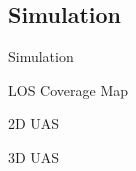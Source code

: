 \subsection{Simulation}

\begin{frame}{Simulation}{}

  \begin{block}{LOS Coverage Map}

  \end{block}
  
  \begin{block}{2D UAS}

  \end{block}

  \begin{block}{3D UAS}

  \end{block}

\end{frame}